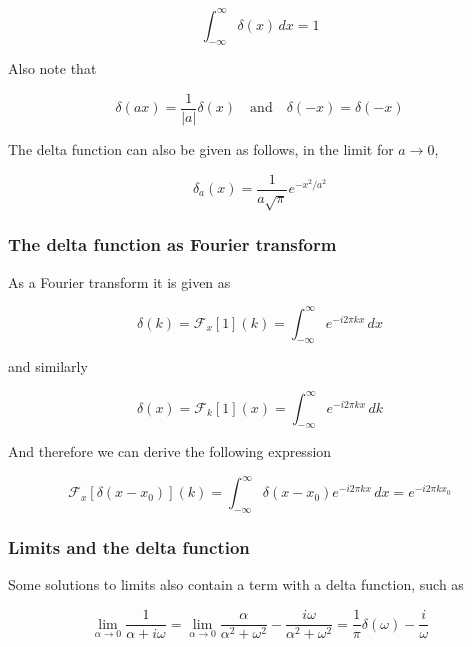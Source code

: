 \documentclass[a4paper]{article}
\begin{document}
\begin{equation*}
    \int_{-\infty}^{\infty}\delta(x)\,dx=1
\end{equation*}

Also note that

\begin{equation*}
    \delta(ax)=\frac{1}{|a|}\delta(x)\quad\text{and}\quad\delta(-x)=\delta(-x)
\end{equation*}

The delta function can also be given as follows, in the limit for $a\rightarrow 0$,

\begin{equation*}
    \delta_a(x)=\frac{1}{a\sqrt{\pi}}e^{-x^2/a^2}
\end{equation*}

\subsubsection*{The delta function as Fourier transform}

As a Fourier transform it is given as

\begin{equation*}
    \delta(k)=\mathcal{F}_x[1](k)=\int_{-\infty}^{\infty}e^{-i2\pi kx}\,dx
\end{equation*}

and similarly

\begin{equation*}
    \delta(x)=\mathcal{F}_k[1](x)=\int_{-\infty}^{\infty}e^{-i2\pi kx}\,dk
\end{equation*}

And therefore we can derive the following expression

\begin{equation*}
    \mathcal{F}_x[\delta(x-x_0)](k)=\int_{-\infty}^{\infty}\delta(x-x_0)e^{-i2\pi kx}\,dx=e^{-i2\pi kx_0}
\end{equation*}

\subsubsection*{Limits and the delta function}

Some solutions to limits also contain a term with a delta function, such as

\begin{equation*}
    \lim_{\alpha\rightarrow 0}\frac{1}{\alpha+i\omega}=\lim_{\alpha\rightarrow 0}\frac{\alpha}{\alpha^2+\omega^2}-\frac{i\omega}{\alpha^2+\omega^2}=\frac{1}{\pi}\delta(\omega)-\frac{i}{\omega}
\end{equation*}
\end{document}
